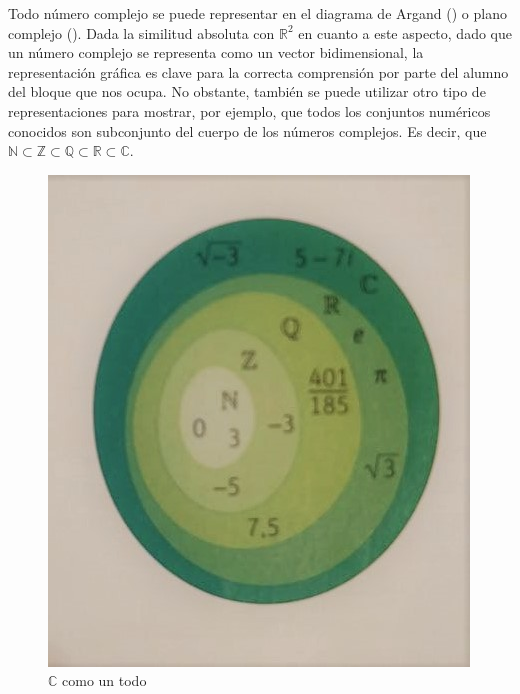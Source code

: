 \documentclass[../main.tex]{memoir}
\begin{document}
Todo número complejo se puede representar en el diagrama de Argand (\cite{argand1971}) o plano complejo (\cite{whittaker1927}). Dada la similitud absoluta con $\mathbb{R}^2$ en cuanto a este aspecto, dado que un número complejo se representa como un vector bidimensional, la representación gráfica es clave para la correcta comprensión por parte del alumno del bloque que nos ocupa. No obstante, también se puede utilizar otro tipo de representaciones para mostrar, por ejemplo, que todos los conjuntos numéricos conocidos son subconjunto del cuerpo de los números complejos. Es decir, que $\mathbb{N} \subset \mathbb{Z} \subset \mathbb{Q} \subset \mathbb{R} \subset \mathbb{C}$. 

\begin{figure}[H]
	\centering
	\includegraphics[scale=0.3]{images/complex.jpg}
	\caption{$\mathbb{C}$ como un todo}
	\label{representacion1}
\end{figure}
\end{document}
